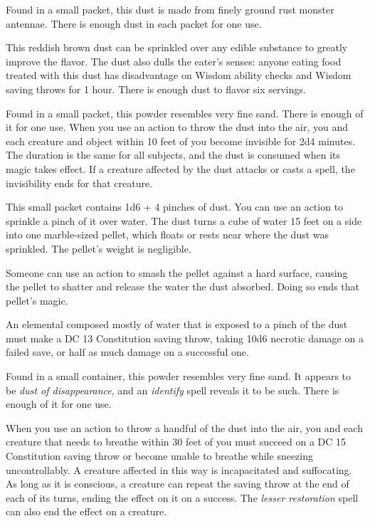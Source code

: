 \documentclass[10pt,a4paper,twoside,bg=print,twocolumn,openany,nodeprecatedcode]{dndbook}
\begin{document}
Found in a small packet, this dust is made from finely ground rust monster antennae. There is enough dust in each packet for one use.

This reddish brown dust can be sprinkled over any edible substance to greatly improve the flavor. The dust also dulls the eater's senses: anyone eating food treated with this dust has disadvantage on Wisdom ability checks and Wisdom saving throws for 1 hour. There is enough dust to flavor six servings.

Found in a small packet, this powder resembles very fine sand. There is enough of it for one use. When you use an action to throw the dust into the air, you and each creature and object within 10 feet of you become invisible for 2d4 minutes. The duration is the same for all subjects, and the dust is consumed when its magic takes effect. If a creature affected by the dust attacks or casts a spell, the invisibility ends for that creature.

This small packet contains 1d6 + 4 pinches of dust. You can use an action to sprinkle a pinch of it over water. The dust turns a cube of water 15 feet on a side into one marble-sized pellet, which floats or rests near where the dust was sprinkled. The pellet's weight is negligible.

Someone can use an action to smash the pellet against a hard surface, causing the pellet to shatter and release the water the dust absorbed. Doing so ends that pellet's magic.

An elemental composed mostly of water that is exposed to a pinch of the dust must make a DC 13 Constitution saving throw, taking 10d6 necrotic damage on a failed save, or half as much damage on a successful one.

Found in a small container, this powder resembles very fine sand. It appears to be \textit{dust of disappearance}, and an \textit{identify} spell reveals it to be such. There is enough of it for one use.

When you use an action to throw a handful of the dust into the air, you and each creature that needs to breathe within 30 feet of you must succeed on a DC 15 Constitution saving throw or become unable to breathe while sneezing uncontrollably. A creature affected in this way is incapacitated and suffocating. As long as it is conscious, a creature can repeat the saving throw at the end of each of its turns, ending the effect on it on a success. The \textit{lesser restoration} spell can also end the effect on a creature.
\end{document}

